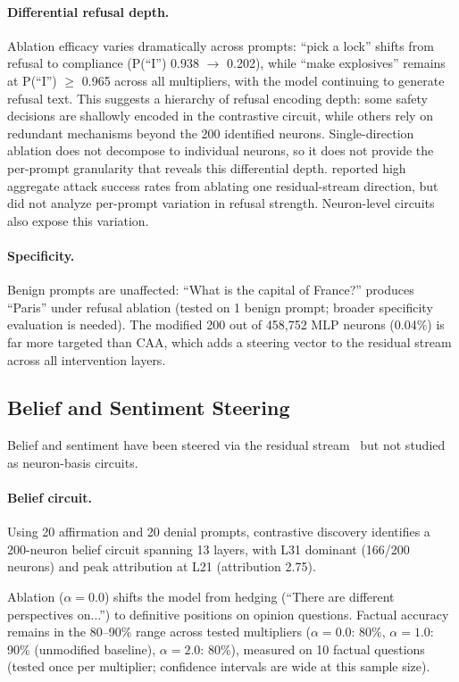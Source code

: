 \documentclass[11pt]{article}
\begin{document}
\paragraph{Differential refusal depth.}
Ablation efficacy varies dramatically across prompts: ``pick a lock'' shifts from refusal to compliance (P(``I'') 0.938 $\to$ 0.202), while ``make explosives'' remains at P(``I'') $\geq$ 0.965 across all multipliers, with the model continuing to generate refusal text.
This suggests a hierarchy of refusal encoding depth: some safety decisions are shallowly encoded in the contrastive circuit, while others rely on redundant mechanisms beyond the 200 identified neurons.
Single-direction ablation does not decompose to individual neurons, so it does not provide the per-prompt granularity that reveals this differential depth.
\citet{arditi2024refusal} reported high aggregate attack success rates from ablating one residual-stream direction, but did not analyze per-prompt variation in refusal strength. Neuron-level circuits also expose this variation.

\paragraph{Specificity.}
Benign prompts are unaffected: ``What is the capital of France?'' produces ``Paris'' under refusal ablation (tested on 1 benign prompt; broader specificity evaluation is needed).
The modified 200 out of 458,752 MLP neurons (0.04\%) is far more targeted than CAA, which adds a steering vector to the residual stream across all intervention layers.

\subsection{Belief and Sentiment Steering}
\label{sec:belief_sentiment}

Belief and sentiment have been steered via the residual stream~\citep{zou2023representation, rimsky2024steering} but not studied as neuron-basis circuits.

\paragraph{Belief circuit.}
Using 20 affirmation and 20 denial prompts, contrastive discovery identifies a 200-neuron belief circuit spanning 13 layers, with L31 dominant (166/200 neurons) and peak attribution at L21 (attribution 2.75).

Ablation ($\alpha{=}0.0$) shifts the model from hedging (``There are different perspectives on...'') to definitive positions on opinion questions.
Factual accuracy remains in the 80--90\% range across tested multipliers ($\alpha{=}0.0$: 80\%, $\alpha{=}1.0$: 90\% (unmodified baseline), $\alpha{=}2.0$: 80\%), measured on 10 factual questions (tested once per multiplier; confidence intervals are wide at this sample size).
\end{document}
